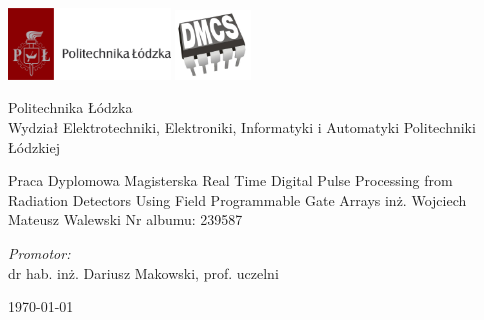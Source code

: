 \begin{titlepage}



\includegraphics[width=4.3cm]{media/unilogo.png}
\hspace{\fill}
\includegraphics[width=2cm]{media/faculty.jpg}

\begin{center}
Politechnika Łódzka\\%
Wydział Elektrotechniki, Elektroniki, Informatyki i Automatyki Politechniki Łódzkiej\\%
\end{center}
\begin{center}




Praca Dyplomowa Magisterska
Real Time Digital Pulse Processing from Radiation Detectors Using Field Programmable Gate Arrays
inż. Wojciech Mateusz Walewski
Nr albumu: 239587

\noindent
\begin{minipage}{0.8\textwidth}
\begin{flushright} \large
\emph{Promotor:} \\
dr hab. inż. Dariusz Makowski, prof. uczelni\\
\end{flushright}
\end{minipage}

\vfill


{\today}




\vfill
\end{center}
\end{titlepage}

